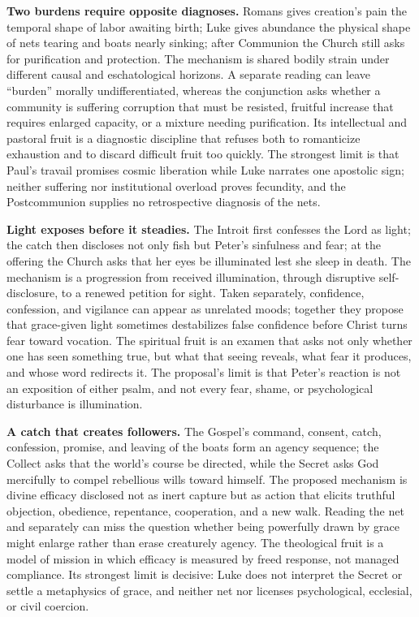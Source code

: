 \begin{deepstudy}
\noindent\textbf{Two burdens require opposite diagnoses.\enspace{}}
Romans gives creation's pain the temporal shape of labor awaiting birth; Luke gives abundance the physical shape of nets tearing and boats nearly sinking; after Communion the Church still asks for purification and protection. The mechanism is shared bodily strain under different causal and eschatological horizons. A separate reading can leave ``burden'' morally undifferentiated, whereas the conjunction asks whether a community is suffering corruption that must be resisted, fruitful increase that requires enlarged capacity, or a mixture needing purification. Its intellectual and pastoral fruit is a diagnostic discipline that refuses both to romanticize exhaustion and to discard difficult fruit too quickly. The strongest limit is that Paul's travail promises cosmic liberation while Luke narrates one apostolic sign; neither suffering nor institutional overload proves fecundity, and the Postcommunion supplies no retrospective diagnosis of the nets.

\noindent\textbf{Light exposes before it steadies.\enspace{}}
The Introit first confesses the Lord as light; the catch then discloses not only fish but Peter's sinfulness and fear; at the offering the Church asks that her eyes be illuminated lest she sleep in death. The mechanism is a progression from received illumination, through disruptive self-disclosure, to a renewed petition for sight. Taken separately, confidence, confession, and vigilance can appear as unrelated moods; together they propose that grace-given light sometimes destabilizes false confidence before Christ turns fear toward vocation. The spiritual fruit is an examen that asks not only whether one has seen something true, but what that seeing reveals, what fear it produces, and whose word redirects it. The proposal's limit is that Peter's reaction is not an exposition of either psalm, and not every fear, shame, or psychological disturbance is illumination.

\noindent\textbf{A catch that creates followers.\enspace{}}
The Gospel's command, consent, catch, confession, promise, and leaving of the boats form an agency sequence; the Collect asks that the world's course be directed, while the Secret asks God mercifully to compel rebellious wills toward himself. The proposed mechanism is divine efficacy disclosed not as inert capture but as action that elicits truthful objection, obedience, repentance, cooperation, and a new walk. Reading the net and  separately can miss the question whether being powerfully drawn by grace might enlarge rather than erase creaturely agency. The theological fruit is a model of mission in which efficacy is measured by freed response, not managed compliance. Its strongest limit is decisive: Luke does not interpret the Secret or settle a metaphysics of grace, and neither net nor  licenses psychological, ecclesial, or civil coercion.


\end{deepstudy}
